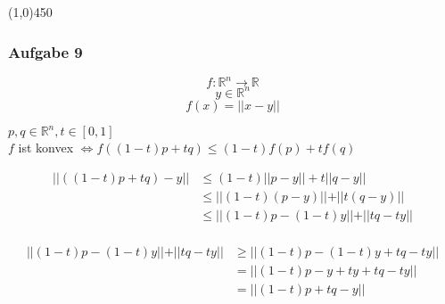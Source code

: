 \documentclass{article}
\newcommand{\hr}{\begin{center} \line(1,0){450} \end{center}}
\begin{document}
\hr
\subsubsection*{Aufgabe 9}

	$$f: \mathbb{R}^n \rightarrow \mathbb{R}$$
	$$y \in \mathbb{R}^n$$
	$$f(x) = \vert\vert x -y \vert \vert$$

	

	\begin{center}
		$p,q \in \mathbb{R}^n,t \in \left[0,1 \right]$\\
		$f$ ist konvex $\Leftrightarrow f((1-t)p+tq) \leq (1-t)f(p)+ tf(q)$ 
	\end{center}
	

\begin{equation*}
\begin{split}
	\vert \vert ((1-t)p + tq) -y \vert \vert &\leq (1-t) \vert \vert p -y\vert \vert + t\vert \vert q -y\vert \vert\\
	&\leq  \vert \vert (1-t) (p - y)\vert \vert + \vert \vert t(q -y)\vert \vert\\
	&\leq  \vert \vert  (1-t)p - (1-t)y\vert \vert + \vert \vert tq -ty\vert \vert\\
\end{split}
\end{equation*}

\begin{equation*}
\begin{split}
\vert \vert  (1-t)p - (1-t)y\vert \vert + \vert \vert tq -ty\vert \vert &\geq \vert \vert (1-t)p - (1-t)y +tq -ty \vert \vert \\
&= \vert \vert (1-t)p - y +ty +tq -ty\vert \vert \\
&= \vert \vert (1-t)p + tq - y\vert \vert\\
\end{split}
\end{equation*}
\end{document}
